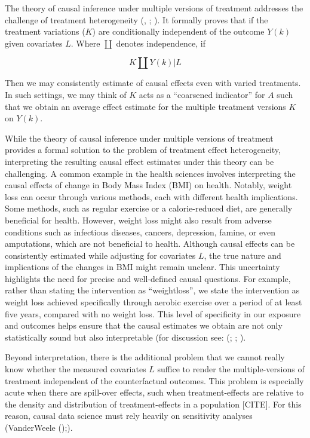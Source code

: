 \documentclass[
  singlecolumn,
  9pt]{article}
\begin{document}
The theory of causal inference under multiple versions of treatment
addresses the challenge of treatment heterogeneity
(,
;
). It
formally proves that if the treatment variations (\(K\)) are
conditionally independent of the outcome \(Y(k)\) given covariates
\(L\). Where \(\coprod\) denotes independence, if

\[
K \coprod Y(k) | L
\]

Then we may consistently estimate of causal effects even with varied
treatments. In such settings, we may think of \(K\) acts as a
``coarsened indicator'' for \(A\) such that we obtain an average effect
estimate for the multiple treatment versions \(K\) on \(Y(k)\).

While the theory of causal inference under multiple versions of
treatment provides a formal solution to the problem of treatment effect
heterogeneity, interpreting the resulting causal effect estimates under
this theory can be challenging. A common example in the health sciences
involves interpreting the causal effects of change in Body Mass Index
(BMI) on health. Notably, weight loss can occur through various methods,
each with different health implications. Some methods, such as regular
exercise or a calorie-reduced diet, are generally beneficial for health.
However, weight loss might also result from adverse conditions such as
infectious diseases, cancers, depression, famine, or even amputations,
which are not beneficial to health. Although causal effects can be
consistently estimated while adjusting for covariates \(L\), the true
nature and implications of the changes in BMI might remain unclear. This
uncertainty highlights the need for precise and well-defined causal
questions. For example, rather than stating the intervention as
``weightloss'', we state the intervention as weight loss achieved
specifically through aerobic exercise over a period of at least five
years, compared with no weight loss. This level of specificity in our
exposure and outcomes helps ensure that the causal estimates we obtain
are not only statistically sound but also interpretable (for discussion
see: (;
;
).

Beyond interpretation, there is the additional problem that we cannot
really know whether the measured covariates \(L\) suffice to render the
multiple-versions of treatment independent of the counterfactual
outcomes. This problem is especially acute when there are spill-over
effects, such when treatment-effects are relative to the density and
distribution of treatment-effects in a population {[}CITE{]}. For this
reason, causal data science must rely heavily on sensitivity analyses
(VanderWeele ();).
\end{document}
